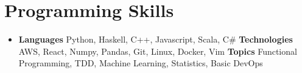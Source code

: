 \documentclass[letterpaper,11pt]{article}
\newcommand{\resumeSubHeadingListStart}{\begin{itemize}[leftmargin=*]}
\newcommand{\resumeSubHeadingListEnd}{\end{itemize}}
\begin{document}
%
\section{Programming Skills}
  \resumeSubHeadingListStart
    \item{
      \textbf{Languages}{ Python, Haskell, C++, Javascript, Scala, C# }
      \hfill
      \textbf{Technologies}{ AWS, React, Numpy, Pandas, Git, Linux, Docker, Vim }
      \hfill
      \textbf{Topics}{ Functional Programming, TDD, Machine Learning, Statistics, Basic DevOps }
    }
  \resumeSubHeadingListEnd


\end{document}
